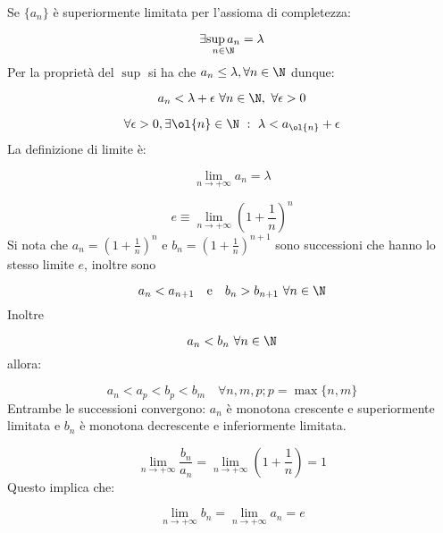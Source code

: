 \documentclass[../analisi.tex]{subfiles}
\begin{document}
\begin{dimo}
Se $ \{ a_n \}$ è superiormente limitata per l'assioma di completezza:

\begin{equation}
	\exists \underset{n \in \N}{\sup a_n} = \lambda
\end{equation}
Per la proprietà del $ \sup$ si ha che $ a_n \leq \lambda, \forall n \in \N$ dunque:

\begin{equation}
	a_n < \lambda + \epsilon \ \forall n \in \N, \ \forall \epsilon > 0
\end{equation}

\begin{equation}
	\forall \epsilon > 0, \exists \ol{n} \in \N\ :\
	\lambda < a_{\ol{n}} + \epsilon
\end{equation}
La definizione di limite è:

\begin{equation}
	\lim \limits_{n \to + \infty} a_n = \lambda
\end{equation}
\end{dimo}

\begin{eser}[Il numero di nepero $ e $]

\begin{equation}
	e \equiv \lim \limits_{n \to + \infty} \left( 1 + \frac{1}{n} \right)^n
\end{equation}
Si nota che $a_n = \left( 1 + \frac{1}{n} \right)^n$ e $ b_n =
\left( 1 + \frac{1}{n} \right)^{n+1}$ sono successioni  che hanno lo stesso limite $ e $, inoltre sono  

\begin{equation}
	a_n < a_{n + 1} \quad \mbox{e} \quad b_n > b_{n+1} \ \forall n \in \N
\end{equation}
Inoltre 

\begin{equation}
	a_n < b_n\ \forall n \in \N 
\end{equation}
allora: 

\begin{equation}
	a_n < a_p < b_p < b_m \quad \forall n,m,p; p = \max \{n, m\}
\end{equation}
Entrambe le successioni convergono: $a_n$ è monotona crescente e superiormente limitata e $b_n$ è monotona decrescente e inferiormente limitata.

\begin{equation}
	\lim \limits_{n \to + \infty} \frac{b_n}{a_n} = 
	\lim \limits_{n \to + \infty} \left( 1 + \frac{1}{n} \right) = 1
\end{equation}
Questo implica che:

\begin{equation} 
	\lim \limits_{n \to + \infty} b_n = 
	\lim \limits_{n \to + \infty} a_n = e
\end{equation}

\end{eser}
\end{document}
